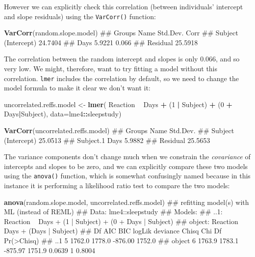 \documentclass[]{article}
\newenvironment{Shaded}{\begin{snugshade}}{\end{snugshade}}
\newcommand{\KeywordTok}[1]{\textcolor[rgb]{0.13,0.29,0.53}{\textbf{#1}}}
\newcommand{\DataTypeTok}[1]{\textcolor[rgb]{0.13,0.29,0.53}{#1}}
\newcommand{\DecValTok}[1]{\textcolor[rgb]{0.00,0.00,0.81}{#1}}
\newcommand{\StringTok}[1]{\textcolor[rgb]{0.31,0.60,0.02}{#1}}
\newcommand{\OperatorTok}[1]{\textcolor[rgb]{0.81,0.36,0.00}{\textbf{#1}}}
\newcommand{\NormalTok}[1]{#1}
\theoremstyle{definition}
\theoremstyle{definition}
\theoremstyle{definition}
\theoremstyle{remark}
\begin{document}
However we can explicitly check this correlation (between individuals'
intercept and slope residuals) using the \texttt{VarCorr()} function:

\begin{Shaded}
\begin{Highlighting}[]
\KeywordTok{VarCorr}\NormalTok{(random.slope.model)}
\NormalTok{##  Groups   Name        Std.Dev. Corr }
\NormalTok{##  Subject  (Intercept) 24.7404       }
\NormalTok{##           Days         5.9221  0.066}
\NormalTok{##  Residual             25.5918}
\end{Highlighting}
\end{Shaded}

The correlation between the random intercept and slopes is only 0.066,
and so very low. We might, therefore, want to try fitting a model
without this correlation. \texttt{lmer} includes the correlation by
default, so we need to change the model formula to make it clear we
don't want it:

\begin{Shaded}
\begin{Highlighting}[]
\NormalTok{uncorrelated.reffs.model <-}\StringTok{ }\KeywordTok{lmer}\NormalTok{(}
\NormalTok{  Reaction }\OperatorTok{~}\StringTok{ }\NormalTok{Days }\OperatorTok{+}\StringTok{ }\NormalTok{(}\DecValTok{1} \OperatorTok{|}\StringTok{ }\NormalTok{Subject) }\OperatorTok{+}\StringTok{ }\NormalTok{(}\DecValTok{0} \OperatorTok{+}\StringTok{ }\NormalTok{Days}\OperatorTok{|}\NormalTok{Subject),  }
  \DataTypeTok{data=}\NormalTok{lme4}\OperatorTok{::}\NormalTok{sleepstudy)}

\KeywordTok{VarCorr}\NormalTok{(uncorrelated.reffs.model)}
\NormalTok{##  Groups    Name        Std.Dev.}
\NormalTok{##  Subject   (Intercept) 25.0513 }
\NormalTok{##  Subject.1 Days         5.9882 }
\NormalTok{##  Residual              25.5653}
\end{Highlighting}
\end{Shaded}

The variance components don't change much when we constrain the
\emph{covariance} of intercepts and slopes to be zero, and we can
explicitly compare these two models using the \texttt{anova()} function,
which is somewhat confusingly named because in this instance it is
performing a likelihood ratio test to compare the two models:

\begin{Shaded}
\begin{Highlighting}[]
\KeywordTok{anova}\NormalTok{(random.slope.model, uncorrelated.reffs.model)}
\NormalTok{## refitting model(s) with ML (instead of REML)}
\NormalTok{## Data: lme4::sleepstudy}
\NormalTok{## Models:}
\NormalTok{## ..1: Reaction ~ Days + (1 | Subject) + (0 + Days | Subject)}
\NormalTok{## object: Reaction ~ Days + (Days | Subject)}
\NormalTok{##        Df    AIC    BIC  logLik deviance  Chisq Chi Df Pr(>Chisq)}
\NormalTok{## ..1     5 1762.0 1778.0 -876.00   1752.0                         }
\NormalTok{## object  6 1763.9 1783.1 -875.97   1751.9 0.0639      1     0.8004}
\end{Highlighting}
\end{Shaded}
\end{document}
